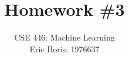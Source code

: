 \title{Homework \#3} 
\author{\normalsize{CSE 446: Machine Learning}\\ 
\normalsize{Eric Boris: 1976637}}
\maketitle
